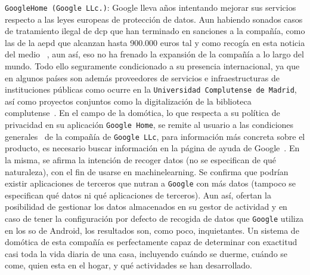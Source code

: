 \verb|GoogleHome (Google LLc.)|: Google lleva años intentando mejorar sus servicios respecto a las leyes europeas de protección de datos. Aun habiendo sonados casos de tratamiento ilegal de \gls{dcp} que han terminado en sanciones a la compañía, como las de la \gls{aepd} que alcanzan hasta 900.000 euros tal y como recogía en esta noticia del medio ~\cite{j.m.sanchez_2014}, aun así, eso no ha frenado la expansión de la compañía a lo largo del mundo. Todo ello seguramente condicionado a su presencia internacional, ya que en algunos países son además proveedores de servicios e infraestructuras de instituciones públicas como ocurre en la \verb|Universidad Complutense de Madrid|, así como proyectos conjuntos como la digitalización de la biblioteca complutense~\cite{bibliotecaucmgoogle8}. En el campo de la domótica, lo que respecta a su política de privacidad en su aplicación \verb|Google Home|, se remite al usuario a las condiciones generales~\cite{googleprivacy} de la compañía de \verb|Google LLc|, para información más concreta sobre el producto, es necesario buscar información en la página de ayuda de Google~\cite{googlenestsecurityandprivacy}. En la misma, se afirma la intención de recoger datos (no se especifican de qué naturaleza), con el fin de usarse en \gls{machinelearning}. Se confirma que podrían existir aplicaciones de terceros que nutran a \verb|Google| con más datos (tampoco se especifican qué datos ni qué aplicaciones de terceros). Aun así, ofertan la posibilidad de gestionar los datos almacenados en su gestor de actividad y en caso de tener la configuración por defecto de recogida de datos que \verb|Google| utiliza en los \gls{so} de Android, los resultados son, como poco, inquietantes. Un sistema de domótica de esta compañía es perfectamente capaz de determinar con exactitud casi toda la vida diaria de una casa, incluyendo cuándo se duerme, cuándo se come, quien esta en el hogar, y qué actividades se han desarrollado.

\vspace{1cm}

